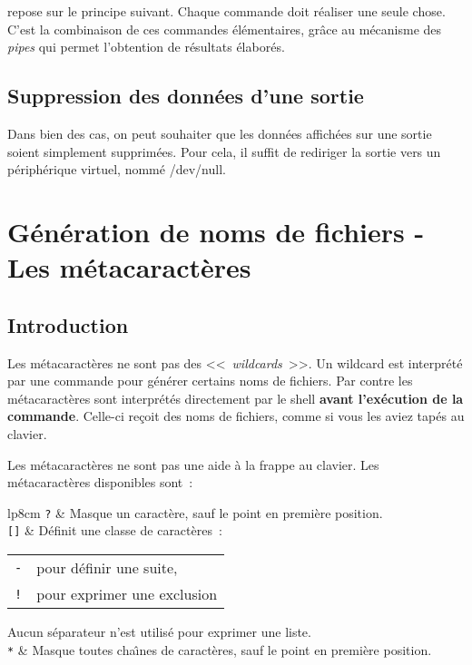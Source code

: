 \begin{remarque}
{\Unix} repose sur le principe suivant. Chaque commande doit r{\'e}aliser
une seule chose. C'est la combinaison de ces commandes {\'e}l{\'e}mentaires,
gr{\^a}ce au m{\'e}canisme des \textsl{pipes} qui permet l'obtention de r{\'e}sultats
{\'e}labor{\'e}s.

\subsection{Suppression des donn{\'e}es d'une sortie}

Dans bien des cas, on peut souhaiter que les donn{\'e}es affich{\'e}es sur une sortie soient 
simplement supprim{\'e}es. Pour cela, il suffit de rediriger la sortie vers un p{\'e}riph{\'e}rique
virtuel, nomm{\'e} /dev/null. 
\begin{center}
\end{center}


\section{\label{basic-metacars}G{\'e}n{\'e}ration de noms de fichiers - Les m{\'e}tacaract{\`e}res}

\subsection{Introduction}

Les m{\'e}tacaract{\`e}res ne sont pas des
<<~\textsl{wildcards}~>>. Un wildcard est
interpr{\'e}t{\'e} par une commande pour g{\'e}n{\'e}rer certains noms
de fichiers. Par contre les m{\'e}tacaract{\`e}res sont
interpr{\'e}t{\'e}s directement par le shell \textbf{avant
l'ex{\'e}cution de la commande}. Celle-ci re\c{c}oit des noms de
fichiers, comme si vous les aviez tap{\'e}s au clavier.

Les m{\'e}tacaract{\`e}res ne sont pas une aide {\`a} la frappe au clavier.
Les m{\'e}tacaract{\`e}res disponibles sont~:~\\
\begin{tabular}{lp{8cm}}
	\texttt{?}		&
	Masque un caract{\`e}re, sauf le point en premi{\`e}re position.\\[0.5cm]
	\texttt{[]}		&
	D{\'e}finit une classe de caract{\`e}res~:
	\begin{tabular}{lp{5cm}}
		\index{-@\texttt{-}}\texttt{-}	& pour d{\'e}finir une suite,\\
		\index{!@\texttt{!}}\texttt{!}	& pour exprimer une exclusion
	\end{tabular}
	Aucun s{\'e}parateur n'est utilis{\'e} pour exprimer une liste.\\[0.5cm]
	\texttt{*}		&
	Masque toutes cha{\^\i}nes de caract{\`e}res, sauf le point en premi{\`e}re position.
\end{tabular}


\end{remarque}
